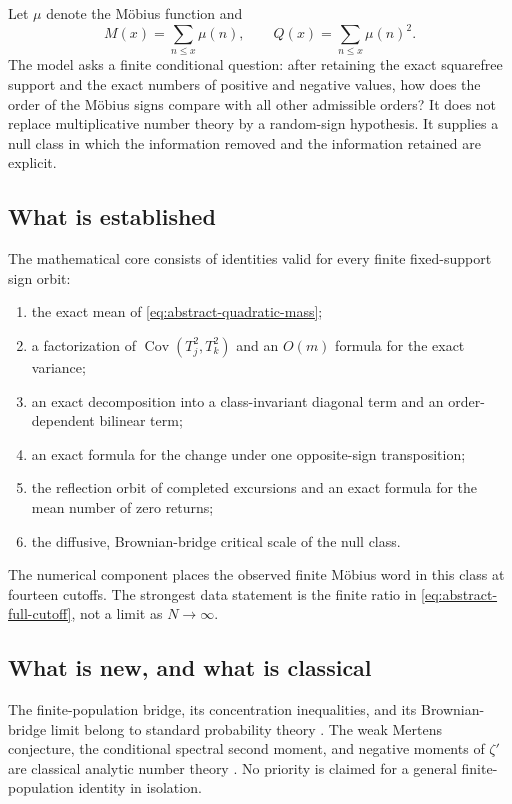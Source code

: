 \documentclass[11pt,reqno]{amsart}
\numberwithin{equation}{section}
\theoremstyle{plain}
\theoremstyle{definition}
\theoremstyle{remark}
\newcommand{\Cov}{\operatorname{Cov}}
\begin{document}
Let \(\mu\) denote the M\"obius function and
\begin{equation}
M(x)=\sum_{n\leq x}\mu(n),\qquad
Q(x)=\sum_{n\leq x}\mu(n)^2.
\label{eq:mertens-and-squarefree-count}
\end{equation}
The model asks a finite conditional question: after retaining the exact
squarefree support and the exact numbers of positive and negative values, how
does the order of the M\"obius signs compare with all other admissible orders?
It does not replace multiplicative number theory by a random-sign hypothesis.
It supplies a null class in which the information removed and the information
retained are explicit.

\subsection{What is established}
\label{subsec:established-summary}

The mathematical core consists of identities valid for every finite
fixed-support sign orbit:
\begin{enumerate}[label=(\roman*)]
\item the exact mean of \eqref{eq:abstract-quadratic-mass};
\item a factorization of
\(\Cov(T_j^2,T_k^2)\) and an \(O(m)\) formula for the exact variance;
\item an exact decomposition into a class-invariant diagonal term and an
order-dependent bilinear term;
\item an exact formula for the change under one opposite-sign transposition;
\item the reflection orbit of completed excursions and an exact formula for
the mean number of zero returns;
\item the diffusive, Brownian-bridge critical scale of the null class.
\end{enumerate}
The numerical component places the observed finite M\"obius word in this
class at fourteen cutoffs.  The strongest data statement is the finite ratio
in \eqref{eq:abstract-full-cutoff}, not a limit as \(N\to\infty\).

\subsection{What is new, and what is classical}
\label{subsec:novelty-boundary}

The finite-population bridge, its concentration inequalities, and its
Brownian-bridge limit belong to standard probability theory
\cite{Hoeffding1963,Serfling1974,Sen1972,BardenetMaillard2015}.  The weak
Mertens conjecture, the conditional spectral second moment, and negative
moments of \(\zeta'\) are classical analytic number theory
\cite{Titchmarsh1986,Ng2004,Gonek1989}.  No priority is claimed for a general
finite-population identity in isolation.
\end{document}
